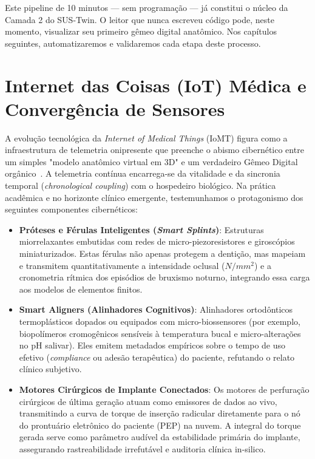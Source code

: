 Este pipeline de 10 minutos --- sem programação --- já constitui o núcleo da Camada 2 do SUS-Twin. O leitor que nunca escreveu código pode, neste momento, visualizar seu primeiro gêmeo digital anatômico. Nos capítulos seguintes, automatizaremos e validaremos cada etapa deste processo.

\section{Internet das Coisas (IoT) Médica e Convergência de Sensores}

A evolução tecnológica da \textit{Internet of Medical Things} (IoMT) figura como a infraestrutura de telemetria onipresente que preenche o abismo cibernético entre um simples "modelo anatômico virtual em 3D" e um verdadeiro Gêmeo Digital orgânico~\cite{mdpi2025digital}. A telemetria contínua encarrega-se da vitalidade e da sincronia temporal (\textit{chronological coupling}) com o hospedeiro biológico. Na prática acadêmica e no horizonte clínico emergente, testemunhamos o protagonismo dos seguintes componentes cibernéticos:

\begin{itemize}
    \item \textbf{Próteses e Férulas Inteligentes (\textit{Smart Splints})}: Estruturas miorrelaxantes embutidas com redes de micro-piezoresistores e giroscópios miniaturizados. Estas férulas não apenas protegem a dentição, mas mapeiam e transmitem quantitativamente a intensidade oclusal ($N/mm^2$) e a cronometria rítmica dos episódios de bruxismo noturno, integrando essa carga aos modelos de elementos finitos.
    \item \textbf{Smart Aligners (Alinhadores Cognitivos)}: Alinhadores ortodônticos termoplásticos dopados ou equipados com micro-biossensores (por exemplo, biopolímeros cromogênicos sensíveis à temperatura bucal e micro-alterações no pH salivar). Eles emitem metadados empíricos sobre o tempo de uso efetivo (\textit{compliance} ou adesão terapêutica) do paciente, refutando o relato clínico subjetivo.
    \item \textbf{Motores Cirúrgicos de Implante Conectados}: Os motores de perfuração cirúrgicos de última geração atuam como emissores de dados ao vivo, transmitindo a curva de torque de inserção radicular diretamente para o nó do prontuário eletrônico do paciente (PEP) na nuvem. A integral do torque gerada serve como parâmetro audível da estabilidade primária do implante, assegurando rastreabilidade irrefutável e auditoria clínica in-silico.
\end{itemize}

